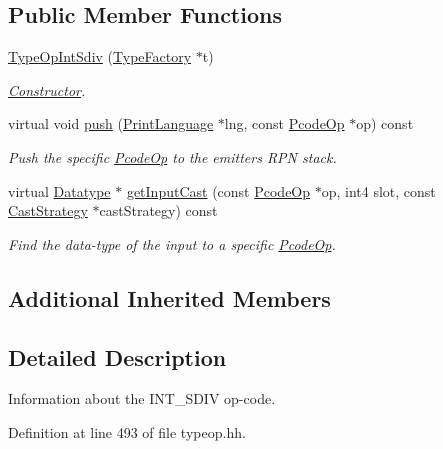 \subsection*{Public Member Functions}
\begin{DoxyCompactItemize}
\item 
\mbox{\hyperlink{class_type_op_int_sdiv_a031d4c1df6f34ab2aecb0e1a82e865cb}{Type\+Op\+Int\+Sdiv}} (\mbox{\hyperlink{class_type_factory}{Type\+Factory}} $\ast$t)
\begin{DoxyCompactList}\small\item\em \mbox{\hyperlink{class_constructor}{Constructor}}. \end{DoxyCompactList}\item 
virtual void \mbox{\hyperlink{class_type_op_int_sdiv_af19cd2db72cf1781f488d2a8c930b015}{push}} (\mbox{\hyperlink{class_print_language}{Print\+Language}} $\ast$lng, const \mbox{\hyperlink{class_pcode_op}{Pcode\+Op}} $\ast$op) const
\begin{DoxyCompactList}\small\item\em Push the specific \mbox{\hyperlink{class_pcode_op}{Pcode\+Op}} to the emitter\textquotesingle{}s R\+PN stack. \end{DoxyCompactList}\item 
virtual \mbox{\hyperlink{class_datatype}{Datatype}} $\ast$ \mbox{\hyperlink{class_type_op_int_sdiv_a32de2e7601277d5c15f49cc455a467ed}{get\+Input\+Cast}} (const \mbox{\hyperlink{class_pcode_op}{Pcode\+Op}} $\ast$op, int4 slot, const \mbox{\hyperlink{class_cast_strategy}{Cast\+Strategy}} $\ast$cast\+Strategy) const
\begin{DoxyCompactList}\small\item\em Find the data-\/type of the input to a specific \mbox{\hyperlink{class_pcode_op}{Pcode\+Op}}. \end{DoxyCompactList}\end{DoxyCompactItemize}
\subsection*{Additional Inherited Members}


\subsection{Detailed Description}
Information about the I\+N\+T\+\_\+\+S\+D\+IV op-\/code. 

Definition at line 493 of file typeop.\+hh.



